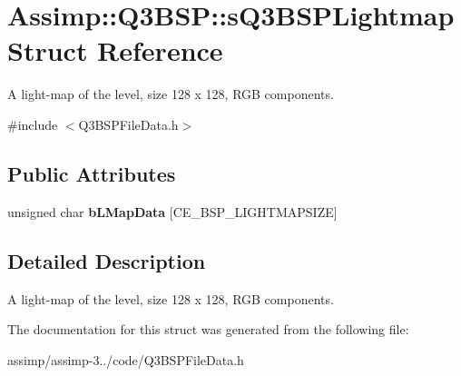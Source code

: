\hypertarget{struct_assimp_1_1_q3_b_s_p_1_1s_q3_b_s_p_lightmap}{\section{Assimp\+:\+:Q3\+B\+S\+P\+:\+:s\+Q3\+B\+S\+P\+Lightmap Struct Reference}
\label{struct_assimp_1_1_q3_b_s_p_1_1s_q3_b_s_p_lightmap}
}


A light-\/map of the level, size 128 x 128, R\+G\+B components.  




{\ttfamily \#include $<$Q3\+B\+S\+P\+File\+Data.\+h$>$}

\subsection*{Public Attributes}
\begin{DoxyCompactItemize}
\item 
\hypertarget{struct_assimp_1_1_q3_b_s_p_1_1s_q3_b_s_p_lightmap_a884c0ce1a6e653d9e0a5740d38bd8144}{unsigned char {\bfseries b\+L\+Map\+Data} \mbox{[}C\+E\+\_\+\+B\+S\+P\+\_\+\+L\+I\+G\+H\+T\+M\+A\+P\+S\+I\+Z\+E\mbox{]}}\label{struct_assimp_1_1_q3_b_s_p_1_1s_q3_b_s_p_lightmap_a884c0ce1a6e653d9e0a5740d38bd8144}

\end{DoxyCompactItemize}


\subsection{Detailed Description}
A light-\/map of the level, size 128 x 128, R\+G\+B components. 

The documentation for this struct was generated from the following file\+:\begin{DoxyCompactItemize}
\item 
assimp/assimp-\/3../code/Q3\+B\+S\+P\+File\+Data.\+h\end{DoxyCompactItemize}
